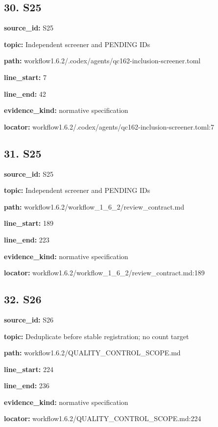 \documentclass[10pt,a4paper]{article}
\begin{document}
\subsection*{30.\allowbreak{} S25}
\textbf{source\_\allowbreak{}id:} S25\par
\textbf{topic:} Independent screener and PENDING IDs\par
\textbf{path:} workflow1.\allowbreak{}6.\allowbreak{}2/\allowbreak{}.\allowbreak{}codex/\allowbreak{}agents/\allowbreak{}qc162-\allowbreak{}inclusion-\allowbreak{}screener.\allowbreak{}toml\par
\textbf{line\_\allowbreak{}start:} 7\par
\textbf{line\_\allowbreak{}end:} 42\par
\textbf{evidence\_\allowbreak{}kind:} normative specification\par
\textbf{locator:} workflow1.\allowbreak{}6.\allowbreak{}2/\allowbreak{}.\allowbreak{}codex/\allowbreak{}agents/\allowbreak{}qc162-\allowbreak{}inclusion-\allowbreak{}screener.\allowbreak{}toml:7\par
\subsection*{31.\allowbreak{} S25}
\textbf{source\_\allowbreak{}id:} S25\par
\textbf{topic:} Independent screener and PENDING IDs\par
\textbf{path:} workflow1.\allowbreak{}6.\allowbreak{}2/\allowbreak{}workflow\_\allowbreak{}1\_\allowbreak{}6\_\allowbreak{}2/\allowbreak{}review\_\allowbreak{}contract.\allowbreak{}md\par
\textbf{line\_\allowbreak{}start:} 189\par
\textbf{line\_\allowbreak{}end:} 223\par
\textbf{evidence\_\allowbreak{}kind:} normative specification\par
\textbf{locator:} workflow1.\allowbreak{}6.\allowbreak{}2/\allowbreak{}workflow\_\allowbreak{}1\_\allowbreak{}6\_\allowbreak{}2/\allowbreak{}review\_\allowbreak{}contract.\allowbreak{}md:189\par
\subsection*{32.\allowbreak{} S26}
\textbf{source\_\allowbreak{}id:} S26\par
\textbf{topic:} Deduplicate before stable registration; no count target\par
\textbf{path:} workflow1.\allowbreak{}6.\allowbreak{}2/\allowbreak{}QUALITY\_\allowbreak{}CONTROL\_\allowbreak{}SCOPE.\allowbreak{}md\par
\textbf{line\_\allowbreak{}start:} 224\par
\textbf{line\_\allowbreak{}end:} 236\par
\textbf{evidence\_\allowbreak{}kind:} normative specification\par
\textbf{locator:} workflow1.\allowbreak{}6.\allowbreak{}2/\allowbreak{}QUALITY\_\allowbreak{}CONTROL\_\allowbreak{}SCOPE.\allowbreak{}md:224\par
\end{document}
